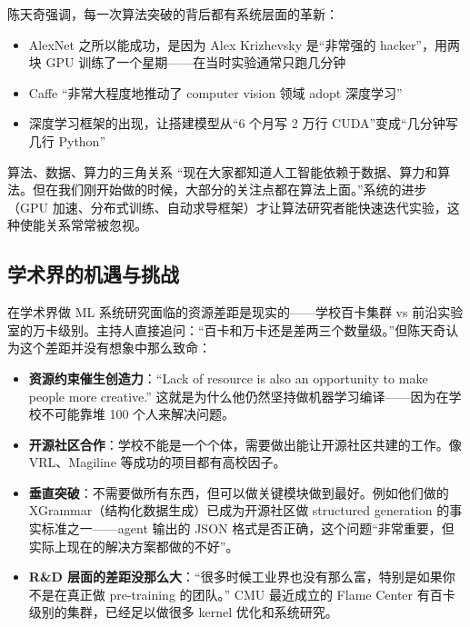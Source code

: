 陈天奇强调，每一次算法突破的背后都有系统层面的革新：

\begin{itemize}
    \item AlexNet 之所以能成功，是因为 Alex Krizhevsky 是``非常强的 hacker''，用两块 GPU 训练了一个星期------在当时实验通常只跑几分钟
    \item Caffe ``非常大程度地推动了 computer vision 领域 adopt 深度学习''
    \item 深度学习框架的出现，让搭建模型从``6 个月写 2 万行 CUDA''变成``几分钟写几行 Python''
\end{itemize}

\begin{importantbox}{算法、数据、算力的三角关系}
``现在大家都知道人工智能依赖于数据、算力和算法。但在我们刚开始做的时候，大部分的关注点都在算法上面。''系统的进步（GPU 加速、分布式训练、自动求导框架）才让算法研究者能快速迭代实验，这种使能关系常常被忽视。
\end{importantbox}

\subsection{学术界的机遇与挑战}

在学术界做 ML 系统研究面临的资源差距是现实的------学校百卡集群 vs 前沿实验室的万卡级别。主持人直接追问：``百卡和万卡还是差两三个数量级。''但陈天奇认为这个差距并没有想象中那么致命：

\begin{itemize}
    \item \textbf{资源约束催生创造力}：``Lack of resource is also an opportunity to make people more creative.'' 这就是为什么他仍然坚持做机器学习编译------因为在学校不可能靠堆 100 个人来解决问题。
    \item \textbf{开源社区合作}：学校不能是一个个体，需要做出能让开源社区共建的工作。像 VRL、Magiline 等成功的项目都有高校因子。
    \item \textbf{垂直突破}：不需要做所有东西，但可以做关键模块做到最好。例如他们做的 XGrammar（结构化数据生成）已成为开源社区做 structured generation 的事实标准之一------agent 输出的 JSON 格式是否正确，这个问题``非常重要，但实际上现在的解决方案都做的不好''。
    \item \textbf{R\&D 层面的差距没那么大}：``很多时候工业界也没有那么富，特别是如果你不是在真正做 pre-training 的团队。'' CMU 最近成立的 Flame Center 有百卡级别的集群，已经足以做很多 kernel 优化和系统研究。
\end{itemize}

